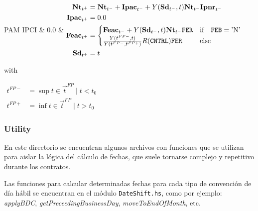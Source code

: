 \documentclass[12pt]{book}
\begin{document}
\begin{functions}{PAM}
	IPCI & 0.0
	& {$\begin{aligned}
					\textbf{Nt}_{t^+}   & = \textbf{Nt}_{t^-} + \textbf{Ipac}_{t^-} + Y (\textbf{Sd}_{t^-},t)\textbf{Nt}_{t^-}\textbf{Ipnr}_{t^-}                                         \\
					\textbf{Ipac}_{t^+} & = 0.0                                                                                                                               \\
					\textbf{Feac}_{t^+} & = \begin{cases} \textbf{Feac}_{t^-} + Y (\textbf{Sd}_{t^-},t)\textbf{Nt}_{t^-}\texttt{FER} & \text{if} \quad \texttt{FEB}=\text{'N'} \\
              \frac{Y (t^{FP-},t)}{Y (t^{FP-},t^{FP+})}R (\texttt{CNTRL})\texttt{FER}      & \text{else}\end{cases} \\
					\textbf{Sd}_{t^+}   & = t\end{aligned}$} \par
	with\par
	{$\begin{aligned}
				t^{FP-} & = \sup t \in \vec{t}^{FP}\mid t<t_0 \\
				t^{FP+} & = \inf t \in \vec{t}^{FP}\mid t>t_0\end{aligned}$} \\
	\hline
\end{functions}
\endgroup




\subsubsection{Utility}

En este directorio se encuentran algunos archivos con funciones que se utilizan para aislar la lógica del cálculo de fechas, que suele tornarse complejo y repetitivo durante los contratos.


Las funciones para calcular determinadas fechas para cada tipo de convención de día hábil se encuentran en el módulo \texttt{DateShift.hs}, como por ejemplo: \textit{applyBDC}, \textit{getPreceedingBusinessDay}, \textit{moveToEndOfMonth}, etc.
\end{document}
